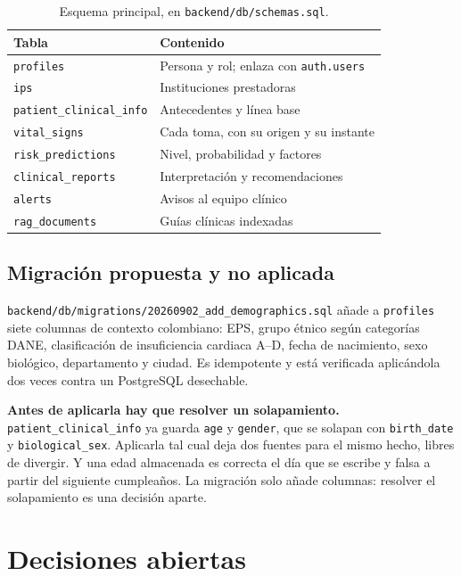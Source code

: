 \documentclass[11pt,a4paper]{article}
\begin{document}
\begin{table}[htbp]\centering
\begin{tabular}{@{}lp{8.2cm}@{}}
\toprule
\textbf{Tabla} & \textbf{Contenido} \\
\midrule
\texttt{profiles} & Persona y rol; enlaza con \texttt{auth.users} \\
\texttt{ips} & Instituciones prestadoras \\
\texttt{patient\_clinical\_info} & Antecedentes y línea base \\
\texttt{vital\_signs} & Cada toma, con su origen y su instante \\
\texttt{risk\_predictions} & Nivel, probabilidad y factores \\
\texttt{clinical\_reports} & Interpretación y recomendaciones \\
\texttt{alerts} & Avisos al equipo clínico \\
\texttt{rag\_documents} & Guías clínicas indexadas \\
\bottomrule
\end{tabular}
\caption{Esquema principal, en \texttt{backend/db/schemas.sql}.}
\end{table}

\subsection{Migración propuesta y no aplicada}

\texttt{backend/db/migrations/20260902\_add\_demographics.sql} añade a
\texttt{profiles} siete columnas de contexto colombiano: EPS, grupo étnico
según categorías DANE, clasificación de insuficiencia cardiaca A--D, fecha de
nacimiento, sexo biológico, departamento y ciudad. Es idempotente y está
verificada aplicándola dos veces contra un PostgreSQL desechable.

\textbf{Antes de aplicarla hay que resolver un solapamiento.}
\texttt{patient\_clinical\_info} ya guarda \texttt{age} y \texttt{gender}, que
se solapan con \texttt{birth\_date} y \texttt{biological\_sex}. Aplicarla tal
cual deja dos fuentes para el mismo hecho, libres de divergir. Y una edad
almacenada es correcta el día que se escribe y falsa a partir del siguiente
cumpleaños. La migración solo añade columnas: resolver el solapamiento es una
decisión aparte.

\newpage
\section{Decisiones abiertas}
\end{document}
